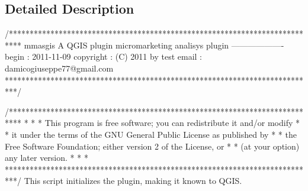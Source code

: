 \subsection{Detailed Description}
\begin{DoxyVerb}
/***************************************************************************
 mmasgis
                                 A QGIS plugin
 micromarketing analisys plugin
                             -------------------
        begin                : 2011-11-09
        copyright            : (C) 2011 by test
        email                : damicogiuseppe77@gmail.com
 ***************************************************************************/

/***************************************************************************
 *                                                                         *
 *   This program is free software; you can redistribute it and/or modify  *
 *   it under the terms of the GNU General Public License as published by  *
 *   the Free Software Foundation; either version 2 of the License, or     *
 *   (at your option) any later version.                                   *
 *                                                                         *
 ***************************************************************************/
 This script initializes the plugin, making it known to QGIS.
\end{DoxyVerb}
 


